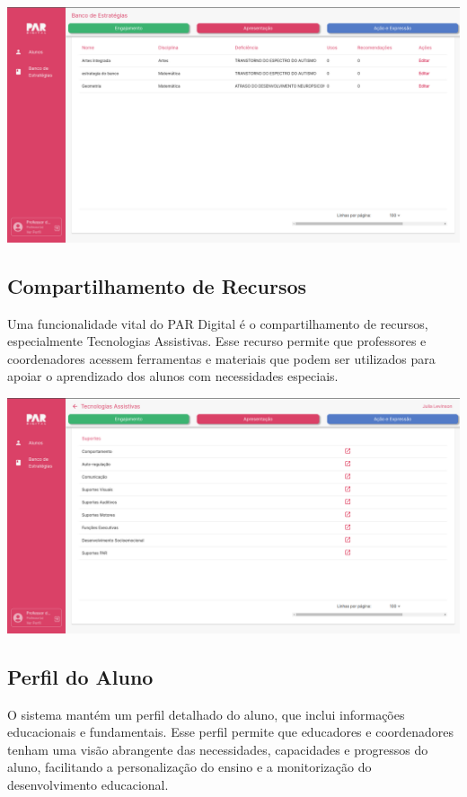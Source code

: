 \documentclass[sigconf]{webmedia}
\begin{document}
\includegraphics[scale=0.12]{./imgs/banco}

\subsection{Compartilhamento de Recursos}
Uma funcionalidade vital do PAR Digital é o compartilhamento de 
recursos, especialmente Tecnologias Assistivas. Esse recurso 
permite que professores e coordenadores acessem ferramentas e 
materiais que podem ser utilizados para apoiar o aprendizado 
dos alunos com necessidades especiais.
\vspace{0.5cm}

\includegraphics[scale=0.12]{./imgs/materialAdd}

\subsection{Perfil do Aluno}
O sistema mantém um perfil detalhado do aluno, que inclui informações
 educacionais e fundamentais. Esse perfil permite que educadores e 
 coordenadores tenham uma visão abrangente das necessidades, 
 capacidades e progressos do aluno, facilitando a personalização 
 do ensino e a monitorização do desenvolvimento educacional.
 \vspace{0.5cm}
\end{document}
